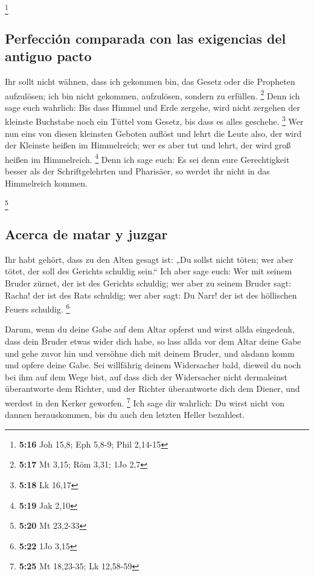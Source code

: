\footnote{\textbf{5:16} Joh 15,8; Eph 5,8-9; Phil 2,14-15}

\hypertarget{perfecciuxf3n-comparada-con-las-exigencias-del-antiguo-pacto}{%
\subsection{Perfección comparada con las exigencias del antiguo
pacto}\label{perfecciuxf3n-comparada-con-las-exigencias-del-antiguo-pacto}}

 Ihr sollt nicht wähnen, dass ich gekommen bin, das
Gesetz oder die Propheten aufzulösen; ich bin nicht gekommen,
aufzulösen, sondern zu erfüllen. \footnote{\textbf{5:17} Mt 3,15; Röm
  3,31; 1Jo 2,7}  Denn ich sage euch wahrlich: Bis dass
Himmel und Erde zergehe, wird nicht zergehen der kleinste Buchstabe noch
ein Tüttel vom Gesetz, bis dass es alles geschehe. \footnote{\textbf{5:18}
  Lk 16,17}  Wer nun eins von diesen kleinsten Geboten
auflöst und lehrt die Leute also, der wird der Kleinste heißen im
Himmelreich; wer es aber tut und lehrt, der wird groß heißen im
Himmelreich. \footnote{\textbf{5:19} Jak 2,10}  Denn ich
sage euch: Es sei denn eure Gerechtigkeit besser als der
Schriftgelehrten und Pharisäer, so werdet ihr nicht in das Himmelreich
kommen.

\footnote{\textbf{5:20} Mt 23,2-33}

\hypertarget{acerca-de-matar-y-juzgar}{%
\subsection{Acerca de matar y juzgar}\label{acerca-de-matar-y-juzgar}}

 Ihr habt gehört, dass zu den Alten gesagt ist: „Du
sollst nicht töten; wer aber tötet, der soll des Gerichts schuldig
sein.``  Ich aber sage euch: Wer mit seinem Bruder
zürnet, der ist des Gerichts schuldig; wer aber zu seinem Bruder sagt:
Racha! der ist des Rats schuldig; wer aber sagt: Du Narr! der ist des
höllischen Feuers schuldig. \footnote{\textbf{5:22} 1Jo 3,15}

 Darum, wenn du deine Gabe auf dem Altar opferst und
wirst allda eingedenk, dass dein Bruder etwas wider dich habe,
 so lass allda vor dem Altar deine Gabe und gehe zuvor
hin und versöhne dich mit deinem Bruder, und alsdann komm und opfere
deine Gabe.  Sei willfährig deinem Widersacher bald,
dieweil du noch bei ihm auf dem Wege bist, auf dass dich der Widersacher
nicht dermaleinst überantworte dem Richter, und der Richter überantworte
dich dem Diener, und werdest in den Kerker geworfen. \footnote{\textbf{5:25}
  Mt 18,23-35; Lk 12,58-59}  Ich sage dir wahrlich: Du
wirst nicht von dannen herauskommen, bis du auch den letzten Heller
bezahlest.

